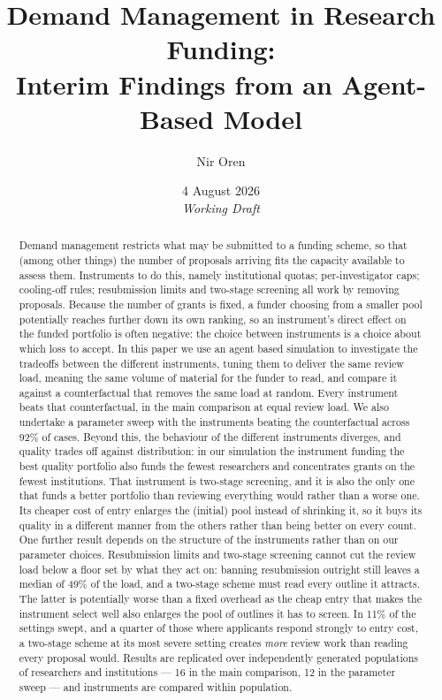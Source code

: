 \documentclass[11pt,a4paper]{article}
\title{Demand Management in Research Funding:\\Interim Findings from an Agent-Based Model}
\author{Nir Oren}
\date{4 August 2026 \\[0.4em] \textit{Working Draft}}
\begin{document}
\maketitle

\begin{abstract}
\noindent
Demand management restricts what may be submitted to a funding scheme, so that (among other things)
the number of proposals arriving fits the capacity available to assess them. Instruments to do this, namely institutional quotas; per-investigator caps;
cooling-off rules; resubmission limits and two-stage screening all work by
removing proposals. Because
the number of grants is fixed, a funder choosing from a smaller pool potentially reaches
further down its own ranking, so an instrument's direct effect on the funded
portfolio is often negative: the choice between instruments is a choice about which
loss to accept. In this paper we use an agent based simulation to investigate the tradeoffs between the different instruments, tuning them to deliver the same review load, meaning the same
volume of material for the funder to read, and compare it against a
counterfactual that removes the same load at random. Every instrument beats that
counterfactual, in the main comparison at equal review load. We also undertake a parameter sweep with the instruments beating the counterfactual across 92\% of cases.  
Beyond this, the behaviour of the different instruments diverges, and quality
trades off against distribution: in our simulation the instrument funding the best
quality portfolio also funds the fewest researchers and concentrates grants on the
fewest institutions. That instrument is two-stage screening, and it is also the only
one that funds a better portfolio than reviewing everything would rather than a
worse one. Its cheaper cost of entry enlarges the (initial) pool instead of
shrinking it, so it buys its quality in a different manner from the others
rather than being better on every count. One
further result depends on the structure of the instruments rather than on our
parameter choices. Resubmission limits and two-stage screening cannot cut the
review load below a floor set by what they act on: banning resubmission outright
still leaves a median of 49\% of the load, and a two-stage scheme must read every
outline it attracts. The latter is potentially  worse than a fixed overhead as the
cheap entry that makes the instrument select well also enlarges the pool of outlines
it has to screen. In 11\% of the settings swept, and a quarter of those where
applicants respond strongly to entry cost, a two-stage scheme at its most severe
setting creates \emph{more} review work than reading every proposal would. Results are replicated over independently
generated populations of researchers and institutions --- 16 in the main
comparison, 12 in the parameter sweep --- and instruments are compared within
population.
\end{abstract}
\end{document}
